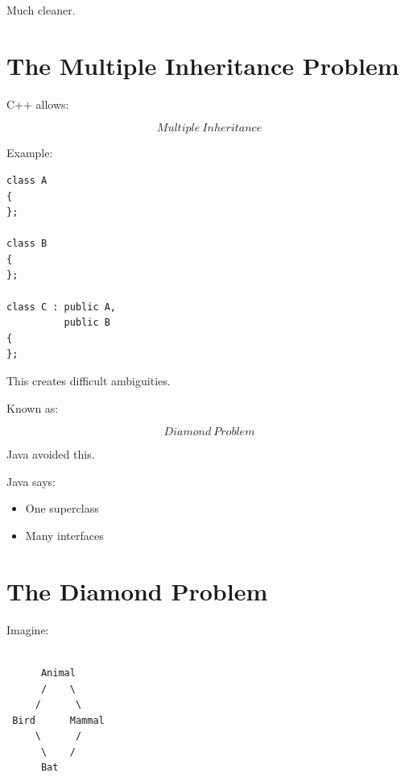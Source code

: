 \documentclass[11pt,a4paper]{book}
\begin{document}

Much cleaner.


\section{The Multiple Inheritance Problem}

C++ allows:

\[
Multiple\ Inheritance
\]


Example:

\begin{verbatim}
class A
{
};

class B
{
};

class C : public A,
          public B
{
};
\end{verbatim}


This creates difficult ambiguities.


Known as:

\[
Diamond\ Problem
\]


Java avoided this.


Java says:

\begin{itemize}
\item One superclass
\item Many interfaces
\end{itemize}


\section{The Diamond Problem}

Imagine:

\begin{verbatim}

      Animal
      /    \
     /      \
 Bird      Mammal
     \      /
      \    /
      Bat

\end{verbatim}
\end{document}
